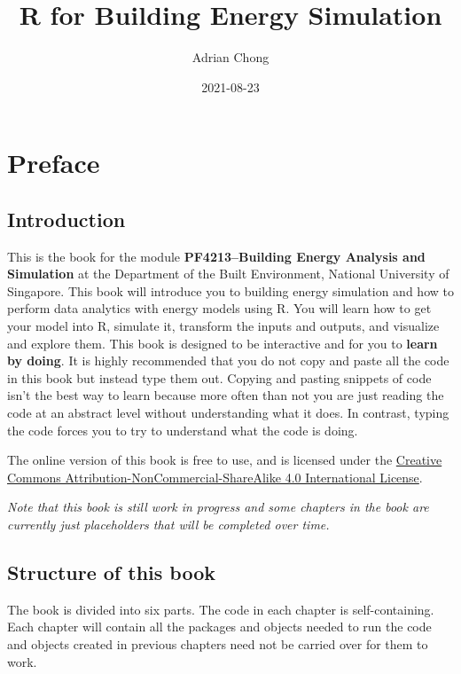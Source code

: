 \documentclass[
]{book}
\title{R for Building Energy Simulation}
\author{Adrian Chong}
\date{2021-08-23}
\begin{document}
\maketitle

{
\setcounter{tocdepth}{1}
\tableofcontents
}
\hypertarget{preface}{%
\chapter*{Preface}\label{preface}}

\hypertarget{introduction}{%
\section*{Introduction}\label{introduction}}

This is the book for the module \textbf{PF4213--Building Energy Analysis and Simulation} at the Department of the Built Environment, National University of Singapore. This book will introduce you to building energy simulation and how to perform data analytics with energy models using R. You will learn how to get your model into R, simulate it, transform the inputs and outputs, and visualize and explore them. This book is designed to be interactive and for you to \textbf{learn by doing}. It is highly recommended that you do not copy and paste all the code in this book but instead type them out. Copying and pasting snippets of code isn't the best way to learn because more often than not you are just reading the code at an abstract level without understanding what it does. In contrast, typing the code forces you to try to understand what the code is doing.

The online version of this book is free to use, and is licensed under the \href{https://creativecommons.org/licenses/by-nc-sa/4.0/}{Creative Commons Attribution-NonCommercial-ShareAlike 4.0 International License}.

\emph{Note that this book is still work in progress and some chapters in the book are currently just placeholders that will be completed over time.}

\hypertarget{structure-of-this-book}{%
\section*{Structure of this book}\label{structure-of-this-book}}

The book is divided into six parts. The code in each chapter is self-containing. Each chapter will contain all the packages and objects needed to run the code and objects created in previous chapters need not be carried over for them to work.
\end{document}
